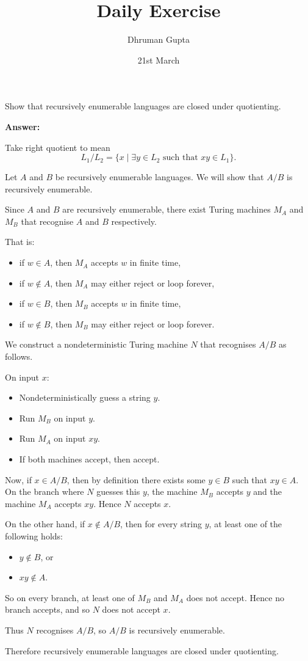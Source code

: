 \documentclass[11pt]{article}
\title{Daily Exercise}
\author{Dhruman Gupta}
\date{21st March}
\begin{document}

Show that recursively enumerable languages are closed under quotienting.

\textbf{Answer:}

Take right quotient to mean
\[
L_1 / L_2 = \{x \mid \exists y \in L_2 \text{ such that } xy \in L_1\}.
\]

Let $A$ and $B$ be recursively enumerable languages. We will show that $A/B$ is recursively enumerable.

Since $A$ and $B$ are recursively enumerable, there exist Turing machines $M_A$ and $M_B$ that recognise $A$ and $B$ respectively.

That is:
\begin{itemize}
    \item if $w \in A$, then $M_A$ accepts $w$ in finite time,
    \item if $w \notin A$, then $M_A$ may either reject or loop forever,
    \item if $w \in B$, then $M_B$ accepts $w$ in finite time,
    \item if $w \notin B$, then $M_B$ may either reject or loop forever.
\end{itemize}

We construct a nondeterministic Turing machine $N$ that recognises $A/B$ as follows.

On input $x$:
\begin{itemize}
    \item Nondeterministically guess a string $y$.
    \item Run $M_B$ on input $y$.
    \item Run $M_A$ on input $xy$.
    \item If both machines accept, then accept.
\end{itemize}

Now, if $x \in A/B$, then by definition there exists some $y \in B$ such that $xy \in A$. On the branch where $N$ guesses this $y$, the machine $M_B$ accepts $y$ and the machine $M_A$ accepts $xy$. Hence $N$ accepts $x$.

On the other hand, if $x \notin A/B$, then for every string $y$, at least one of the following holds:
\begin{itemize}
    \item $y \notin B$, or
    \item $xy \notin A$.
\end{itemize}

So on every branch, at least one of $M_B$ and $M_A$ does not accept. Hence no branch accepts, and so $N$ does not accept $x$.

Thus $N$ recognises $A/B$, so $A/B$ is recursively enumerable.

Therefore recursively enumerable languages are closed under quotienting.
\end{document}
